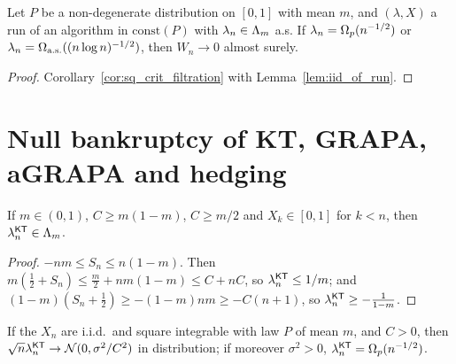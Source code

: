 \begin{corollary}
  \label{cor:sq_crit}
  \leanok
  Let $P$ be a non-degenerate distribution on $[0,1]$ with mean $m$, and $(\lambda, X)$ a run of an
  algorithm in $\mathrm{const}(P)$ with $\lambda_n \in \Lambda_m$ a.s. If $\lambda_n = \Omega_p(n^{-1/2})$ or
  $\lambda_n = \Omega_{\mathrm{a.s.}}((n \log n)^{-1/2})$, then $W_n \to 0$ almost surely.
\end{corollary}

\begin{proof}
  \leanok
  Corollary~\ref{cor:sq_crit_filtration} with Lemma~\ref{lem:iid_of_run}.
\end{proof}

\section{Null bankruptcy of KT, GRAPA, aGRAPA and hedging}

\begin{lemma}
  \label{lem:kt_mem}
  \leanok
  If $m \in (0,1)$, $C \ge m(1-m)$, $C \ge m/2$ and $X_k \in [0,1]$ for $k < n$, then $\lambda^{\mathsf{KT}}_n \in
  \Lambda_m$.
\end{lemma}

\begin{proof}
  \leanok
  $-nm \le S_n \le n(1-m)$. Then $m(\frac12 + S_n) \le \frac m2 + nm(1-m) \le C + nC$, so
  $\lambda^{\mathsf{KT}}_n \le 1/m$; and $(1-m)(S_n + \frac12) \ge -(1-m)nm \ge -C(n+1)$, so $\lambda^{\mathsf{KT}}_n \ge
  -\frac{1}{1-m}$.
\end{proof}

\begin{lemma}
  \label{lem:kt_clt}
  \leanok
  If the $X_n$ are i.i.d.\ and square integrable with law $P$ of mean $m$, and $C > 0$, then
  $\sqrt n \lambda^{\mathsf{KT}}_n \to \mathcal{N}(0, \sigma^2/C^2)$ in distribution; if moreover $\sigma^2 > 0$,
  $\lambda^{\mathsf{KT}}_n = \Omega_p(n^{-1/2})$.
\end{lemma}

